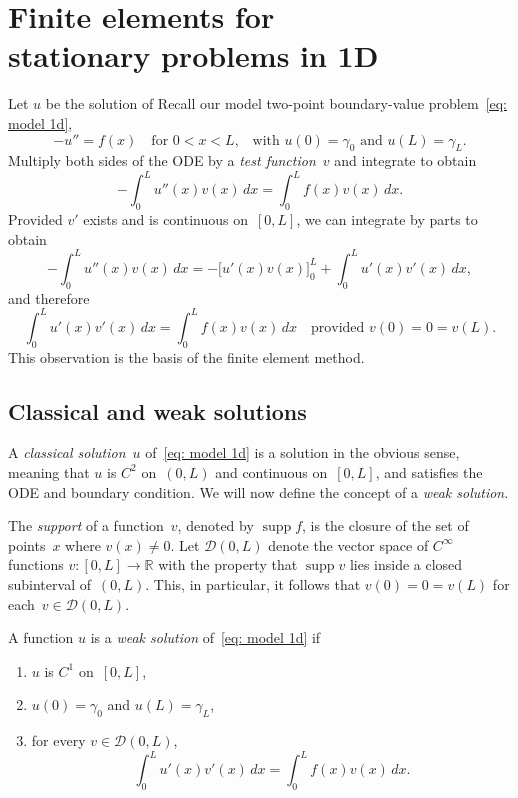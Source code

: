 \chapter[Finite elements in 1D]{Finite elements for \\
stationary problems in 1D}

Let $u$ be the solution of 
Recall our model two-point boundary-value problem~\ref{eq: model 1d}, 
\[
-u''=f(x)\quad\text{for $0<x<L$,}
	\quad\text{with $u(0)=\gamma_0$ and $u(L)=\gamma_L$.}
\]
Multiply both sides of the ODE by a \emph{test function}~$v$ and integrate to 
obtain
\[
-\int_0^L u''(x)v(x)\,dx=\int_0^L f(x)v(x)\,dx.
\]
Provided $v'$ exists and is continuous on~$[0,L]$, we can integrate by parts to 
obtain
\begin{equation}\label{eq: int by parts}
-\int_0^L u''(x)v(x)\,dx=-\bigl[u'(x)v(x)\bigr]_0^L+\int_0^Lu'(x)v'(x)\,dx,
\end{equation}
and therefore
\[
\int_0^L u'(x)v'(x)\,dx=\int_0^L f(x)v(x)\,dx
	\quad\text{provided $v(0)=0=v(L)$.}
\]
This observation is the basis of the finite element method.

\section{Classical and weak solutions}
A \emph{classical solution}~$u$ of~\eqref{eq: model 1d} is a solution in the 
obvious sense, meaning that $u$ is $C^2$ on~$(0,L)$ and continuous on~$[0,L]$,
and satisfies the ODE and boundary condition.  We will now define the concept 
of a \emph{weak solution}.

The \emph{support} of a function~$v$, denoted by $\operatorname{supp}f$, is 
the closure of the set of points~$x$ where $v(x)\ne0$. Let $\mathcal{D}(0,L)$ 
denote the vector space of $C^\infty$ functions $v:[0,L]\to\mathbb{R}$ with the 
property that $\operatorname{supp}v$ lies inside a closed subinterval 
of~$(0,L)$.  This, in particular,
it follows that $v(0)=0=v(L)$ for each~$v\in\mathcal{D}(0,L)$.

\begin{definition}
A function $u$ is a \emph{weak solution} of~\eqref{eq: model 1d} if 
\begin{enumerate}
\item $u$ is $C^1$ on~$[0,L]$,
\item $u(0)=\gamma_0$ and $u(L)=\gamma_L$,
\item for every $v\in\mathcal{D}(0,L)$,
\[
\int_0^L u'(x)v'(x)\,dx=\int_0^Lf(x)v(x)\,dx.
\]
\end{enumerate}
\end{definition}

